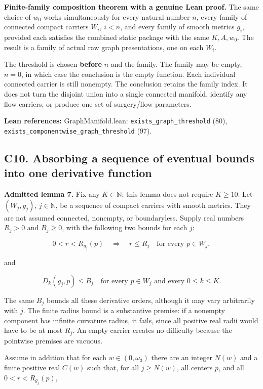 \documentclass[
  letterpaper,
  11pt]{article}
\begin{document}
\textbf{Finite-family composition theorem with a genuine Lean proof.}
The same choice of \(w_0\) works simultaneously for every natural number
\(n\), every family of connected compact carriers \(W_i\), \(i<n\), and
every family of smooth metrics \(g_i\), provided each satisfies the
combined static package with the same \(K,A,w_0\). The result is a
family of actual raw graph presentations, one on each \(W_i\).

The threshold is chosen \textbf{before} \(n\) and the family. The family
may be empty, \(n=0\), in which case the conclusion is the empty
function. Each individual connected carrier is still nonempty. The
conclusion retains the family index. It does not turn the disjoint union
into a single connected manifold, identify any flow carriers, or produce
one set of surgery/flow parameters.

\textbf{Lean references:} GraphManifold.lean:
{\small\texttt{exists\_\allowbreak{}graph\_\allowbreak{}threshold}}
(80),
{\small\texttt{exists\_\allowbreak{}componentwise\_\allowbreak{}graph\_\allowbreak{}threshold}}
(97).

\subsection{C10. Absorbing a sequence of eventual bounds into one
derivative function}\label{collapse-uniform}

\textbf{Admitted lemma 7.} Fix any \(K\in\mathbb N\); this lemma does
not require \(K\geq10\). Let \((W_j,g_j)\), \(j\in\mathbb N\), be a
sequence of compact carriers with smooth metrics. They are not assumed
connected, nonempty, or boundaryless. Supply real numbers \(R_j>0\) and
\(B_j\geq0\), with the following two bounds for each \(j\):

\[
 0<r<R_{g_j}(p)\quad\Longrightarrow\quad r\leq R_j
 \quad\text{for every }p\in W_j,
\]

and

\[
 D_k(g_j,p)\leq B_j\quad
 \text{for every }p\in W_j\text{ and every }0\leq k\leq K.
\]

The same \(B_j\) bounds all these derivative orders, although it may
vary arbitrarily with \(j\). The finite radius bound is a substantive
premise: if a nonempty component has infinite curvature radius, it
fails, since all positive real radii would have to be at most \(R_j\).
An empty carrier creates no difficulty because the pointwise premises
are vacuous.

Assume in addition that for each \(w\in(0,\omega_3)\) there are an
integer \(N(w)\) and a finite positive real \(C(w)\) such that, for all
\(j\geq N(w)\), all centers \(p\), and all \(0<r<R_{g_j}(p)\),
\end{document}
